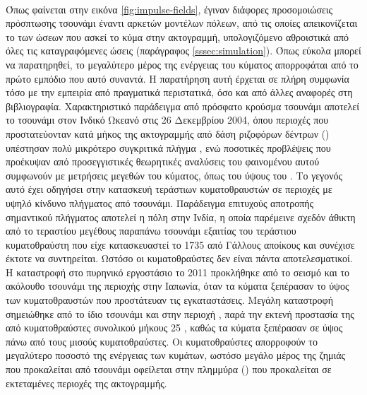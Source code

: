 \paragraph{} Όπως φαίνεται στην εικόνα \ref{fig:impulse-fields}, έγιναν διάφορες
προσομοιώσεις πρόσπτωσης τσουνάμι έναντι αρκετών μοντέλων πόλεων, από τις οποίες
απεικονίζεται το  των ώσεων που ασκεί το κύμα στην ακτογραμμή, υπολογιζόμενο
αθροιστικά από όλες τις καταγραφόμενες ώσεις (παράγραφος \ref{sssec:simulation}). Όπως
εύκολα μπορεί να παρατηρηθεί, το μεγαλύτερο μέρος της ενέργειας του κύματος απορροφάται
από το πρώτο εμπόδιο που αυτό συναντά. Η παρατήρηση αυτή έρχεται σε πλήρη συμφωνία τόσο με
την εμπειρία από πραγματικά περιστατικά, όσο και από άλλες αναφορές στη
βιβλιογραφία. Χαρακτηριστικό παράδειγμα από πρόσφατο κρούσμα τσουνάμι αποτελεί το τσουνάμι
στον Ινδικό Ωκεανό στις 26 Δεκεμβρίου 2004, όπου περιοχές που προστατεύονταν κατά μήκος
της ακτογραμμής από δάση ριζοφόρων δέντρων () υπέστησαν πολύ μικρότερο
συγκριτικά πλήγμα \cite{danielsen2005asian, kathiresan2005601}, ενώ ποσοτικές προβλέψεις
που προέκυψαν από προσεγγιστικές θεωρητικές αναλύσεις του φαινομένου αυτού συμφωνούν με
μετρήσεις μεγεθών του κύματος, όπως του ύψους του \cite{yanagisawa200927}. Το γεγονός αυτό
έχει οδηγήσει στην κατασκευή τεράστιων κυματοθραυστών σε περιοχές με υψηλό κίνδυνο
πλήγματος από τσουνάμι. Παράδειγμα επιτυχούς αποτροπής σημαντικού πλήγματος αποτελεί η
πόλη  στην Ινδία, η οποία παρέμεινε σχεδόν άθικτη από το τεραστίου
μεγέθους παραπάνω τσουνάμι εξαιτίας του τεράστιου κυματοθραύστη που είχε κατασκευαστεί το
1735 από Γάλλους αποίκους και συνέχισε έκτοτε να συντηρείται. Ωστόσο οι κυματοθραύστες δεν
είναι πάντα αποτελεσματικοί. Η καταστροφή στο πυρηνικό εργοστάσιο 
το 2011 προκλήθηκε από το σεισμό και το ακόλουθο τσουνάμι της περιοχής  στην
Ιαπωνία, όταν τα κύματα ξεπέρασαν το ύψος των κυματοθραυστών που προστάτευαν τις
εγκαταστάσεις. Μεγάλη καταστροφή σημειώθηκε από το ίδιο τσουνάμι και στην περιοχή
, παρά την εκτενή προστασία της από κυματοθραύστες συνολικού μήκους 25
, καθώς τα κύματα ξεπέρασαν σε ύψος πάνω από τους μισούς κυματοθραύστες. Οι
κυματοθραύστες απορροφούν το μεγαλύτερο ποσοστό της ενέργειας των κυμάτων, ωστόσο μεγάλο
μέρος της ζημιάς που προκαλείται από τσουνάμι οφείλεται στην πλημμύρα () που
προκαλείται σε εκτεταμένες περιοχές της ακτογραμμής.

